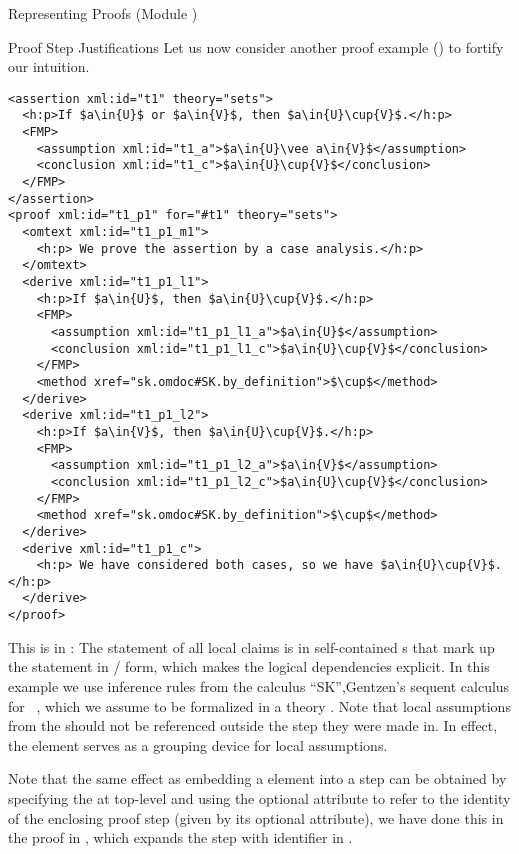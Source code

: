 \begin{omgroup}[id=proofs,short=Representing Proofs]{Representing Proofs (Module {})}
\begin{module}[id=justifications]
\begin{omgroup}[id=proofs.justifications]{Proof Step Justifications}
Let us now consider another proof example ({}) to fortify our intuition.

\begin{lstlisting}[label=lst:expansion,mathescape,
  caption={An {\omdoc} Representation of a Proof by Cases},
  index={proof,derive,method,assumption,conclusion}]
<assertion xml:id="t1" theory="sets">
  <h:p>If $a\in{U}$ or $a\in{V}$, then $a\in{U}\cup{V}$.</h:p>
  <FMP>
    <assumption xml:id="t1_a">$a\in{U}\vee a\in{V}$</assumption>
    <conclusion xml:id="t1_c">$a\in{U}\cup{V}$</conclusion>
  </FMP>
</assertion>
<proof xml:id="t1_p1" for="#t1" theory="sets">
  <omtext xml:id="t1_p1_m1">
    <h:p> We prove the assertion by a case analysis.</h:p>
  </omtext>
  <derive xml:id="t1_p1_l1">
    <h:p>If $a\in{U}$, then $a\in{U}\cup{V}$.</h:p>
    <FMP>
      <assumption xml:id="t1_p1_l1_a">$a\in{U}$</assumption>
      <conclusion xml:id="t1_p1_l1_c">$a\in{U}\cup{V}$</conclusion>
    </FMP>
    <method xref="sk.omdoc#SK.by_definition">$\cup$</method>
  </derive> 
  <derive xml:id="t1_p1_l2">
    <h:p>If $a\in{V}$, then $a\in{U}\cup{V}$.</h:p>
    <FMP>
      <assumption xml:id="t1_p1_l2_a">$a\in{V}$</assumption>
      <conclusion xml:id="t1_p1_l2_c">$a\in{U}\cup{V}$</conclusion>
    </FMP>
    <method xref="sk.omdoc#SK.by_definition">$\cup$</method>
  </derive> 
  <derive xml:id="t1_p1_c">
    <h:p> We have considered both cases, so we have $a\in{U}\cup{V}$.</h:p>
  </derive> 
</proof>
\end{lstlisting}
This  is in {}: The statement of
all local claims is in self-contained {s} that mark up the statement in
{}/{} form, which makes the logical dependencies
explicit. In this example we use inference rules from the calculus ``SK'',Gentzen's
sequent calculus for {}~\cite{Gentzen:uudlsiii35},
which we assume to be formalized in a theory {}.  Note that local assumptions
from the {} should not be referenced outside the {} step they
were made in. In effect, the {} element serves as a grouping device for
local assumptions.

Note that the same effect as embedding a {} element into a
{} step can be obtained by specifying the {} at top-level
and using the optional {} attribute to refer to the identity of the
enclosing proof step (given by its optional {}
attribute), we have done this in the proof in {}, which expands the
{} step with identifier {} in {}.


\end{omgroup}
\end{module}
\end{omgroup}

